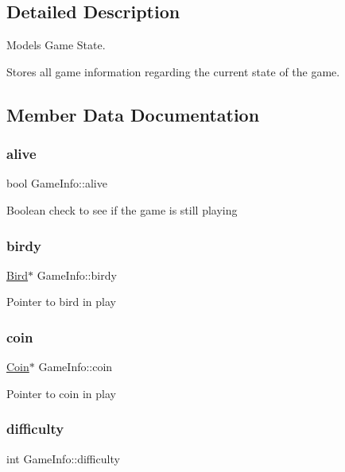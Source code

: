 \subsection{Detailed Description}
Models Game State. 

Stores all game information regarding the current state of the game. 

\subsection{Member Data Documentation}
\mbox{\label{struct_game_info_a47a0b9a98cef651d98214b126d6ed7ec}} 
\subsubsection{\texorpdfstring{alive}{alive}}
{\footnotesize\ttfamily bool Game\+Info\+::alive}

Boolean check to see if the game is still playing \mbox{\label{struct_game_info_aee4a8447023b7f3f3ceb9588cd84c7ce}} 
\subsubsection{\texorpdfstring{birdy}{birdy}}
{\footnotesize\ttfamily \hyperlink{struct_bird}{Bird}$\ast$ Game\+Info\+::birdy}

Pointer to bird in play \mbox{\label{struct_game_info_a7aa65ed4a2ab803f3cad3a2eb1e0947b}} 
\subsubsection{\texorpdfstring{coin}{coin}}
{\footnotesize\ttfamily \hyperlink{struct_coin}{Coin}$\ast$ Game\+Info\+::coin}

Pointer to coin in play \mbox{\label{struct_game_info_ae502ef89edb1039e4bd2e703f8d407b4}} 
\subsubsection{\texorpdfstring{difficulty}{difficulty}}
{\footnotesize\ttfamily int Game\+Info\+::difficulty}

